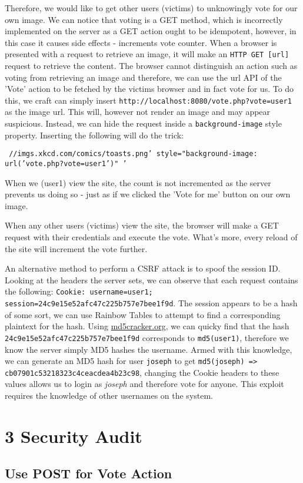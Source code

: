 \documentclass[a4paper, 12pt]{article}
\begin{document}
Therefore, we would like to get other users (victims) to unknowingly vote for our own image. We can notice that voting is a GET method, which is incorrectly implemented on the server as a GET action ought to be idempotent, however, in this case it causes side effects - increments vote counter. When a browser is presented with a request to retrieve an image, it will make an \texttt{HTTP GET [url]} request to retrieve the content. The browser cannot distinguish an action such as voting from retrieving an image and therefore, we can use the url API of the 'Vote' action to be fetched by the victims browser and in fact vote for us. To do this, we craft can simply insert \texttt{http://localhost:8080/vote.php?vote=user1} as the image url. This will, however not render an image and may appear suspicious. Instead, we can hide the request inside a \texttt{background-image} style property. Inserting the following will do the trick:

\texttt{
\newline //imgs.xkcd.com/comics/toasts.png'
\newline style="background-image: url('vote.php?vote=user1')" '}

When we (user1) view the site, the count is not incremented as the server prevents us doing so - just as if we clicked the 'Vote for me' button on our own image.

When any other users (victims) view the site, the browser will make a GET request with their credentials and execute the vote. What's more, every reload of the site will increment the vote further.

An alternative method to perform a CSRF attack is to spoof the session ID. Looking at the headers the server sets, we can observe that each request contains the following:
\texttt{Cookie: username=user1; session=24c9e15e52afc47c225b757e7bee1f9d}. The session appears to be a hash of some sort, we can use Rainbow Tables to attempt to find a corresponding plaintext for the hash. Using \url{md5cracker.org}, we can quicky find that the hash \texttt{24c9e15e52afc47c225b757e7bee1f9d} corresponds to \texttt{md5(user1)}, therefore we know the server simply MD5 hashes the username. Armed with this knowledge, we can generate an MD5 hash for user \texttt{joseph} to get \texttt{\newline md5(joseph) => cb07901c53218323c4ceacdea4b23c98}, changing the Cookie headers to these values allows us to login as \textit{joseph} and therefore vote for anyone. This exploit requires the knowledge of other usernames on the system.

\section*{3 Security Audit}
\subsection*{Use POST for Vote Action}



\newpage


\end{document}
